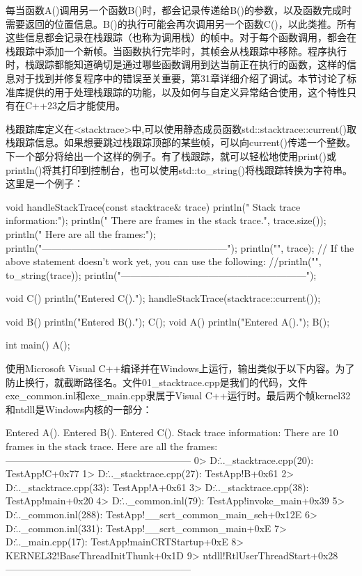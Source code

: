 

每当函数A()调用另一个函数B()时，都会记录传递给B()的参数，以及函数完成时需要返回的位置信息。B()的执行可能会再次调用另一个函数C()，以此类推。所有这些信息都会记录在栈跟踪（也称为调用栈）的帧中。对于每个函数调用，都会在栈跟踪中添加一个新帧。当函数执行完毕时，其帧会从栈跟踪中移除。程序执行时，栈跟踪都能知道确切是通过哪些函数调用到达当前正在执行的函数，这样的信息对于找到并修复程序中的错误至关重要，第31章详细介绍了调试。本节讨论了标准库提供的用于处理栈跟踪的功能，以及如何与自定义异常结合使用，这个特性只有在C++23之后才能使用。


栈跟踪库定义在<stacktrace>中,可以使用静态成员函数std::stacktrace::current()取栈跟踪信息。如果想要跳过栈跟踪顶部的某些帧，可以向current()传递一个整数。下一个部分将给出一个这样的例子。有了栈跟踪，就可以轻松地使用print()或println()将其打印到控制台，也可以使用std::to\_string()将栈跟踪转换为字符串。这里是一个例子：

\begin{cpp}
void handleStackTrace(const stacktrace& trace)
{
    println(" Stack trace information:");
    println("   There are {} frames in the stack trace.", trace.size());
    println("   Here are all the frames:");
    println("---------------------------------------------------------");
    println("{}", trace);
    // If the above statement doesn't work yet, you can use the following:
    //println("{}", to_string(trace));
    println("---------------------------------------------------------");
}

void C()
{
    println("Entered C().");
    handleStackTrace(stacktrace::current());
}

void B() { println("Entered B()."); C(); }
void A() { println("Entered A()."); B(); }

int main()
{
    A();
}
\end{cpp}

使用Microsoft Visual C++编译并在Windows上运行，输出类似于以下内容。为了防止换行，就截断路径名。文件01\_stacktrace.cpp是我们的代码，文件exe\_common.inl和exe\_main.cpp隶属于Visual C++运行时。最后两个帧kernel32和ntdll是Windows内核的一部分：

\begin{shell}
Entered A().
Entered B().
Entered C().
  Stack trace information:
    There are 10 frames in the stack trace.
    Here are all the frames:
---------------------------------------------------------
0> D:\..._stacktrace.cpp(20): TestApp!C+0x77
1> D:\..._stacktrace.cpp(27): TestApp!B+0x61
2> D:\..._stacktrace.cpp(33): TestApp!A+0x61
3> D:\..._stacktrace.cpp(38): TestApp!main+0x20
4> D:\...\exe_common.inl(79): TestApp!invoke_main+0x39
5> D:\...\exe_common.inl(288): TestApp!__scrt_common_main_seh+0x12E
6> D:\...\exe_common.inl(331): TestApp!__scrt_common_main+0xE
7> D:\...\exe_main.cpp(17): TestApp!mainCRTStartup+0xE
8> KERNEL32!BaseThreadInitThunk+0x1D
9> ntdll!RtlUserThreadStart+0x28
---------------------------------------------------------
\end{shell}

